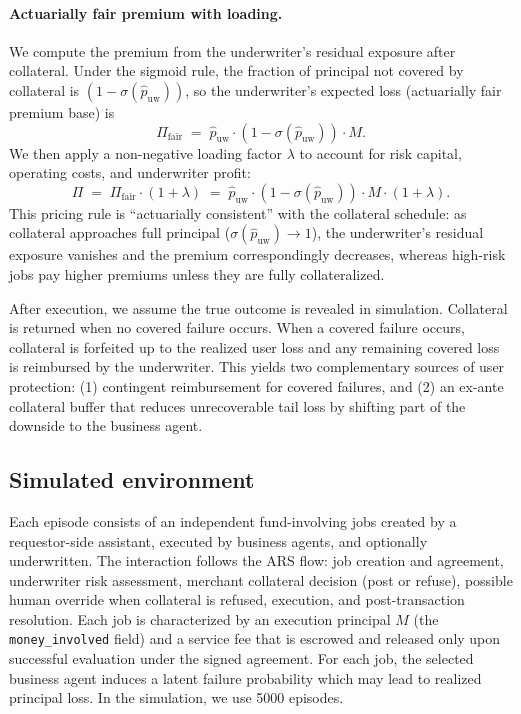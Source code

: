 \documentclass{article} %
\begin{document}
\paragraph{Actuarially fair premium with loading.}
We compute the premium from the underwriter's residual exposure after collateral. Under the sigmoid rule, the fraction of principal not covered by collateral is $(1-\sigma(\hat p_{\mathrm{uw}}))$, so the underwriter's expected loss (actuarially fair premium base) is
\[
\Pi_{\mathrm{fair}} \;=\; \hat p_{\mathrm{uw}}\cdot (1-\sigma(\hat p_{\mathrm{uw}}))\cdot M.
\]
We then apply a non-negative loading factor $\lambda$ to account for risk capital, operating costs, and underwriter profit:
\[
\Pi \;=\; \Pi_{\mathrm{fair}}\cdot (1+\lambda)
\;=\; \hat p_{\mathrm{uw}}\cdot (1-\sigma(\hat p_{\mathrm{uw}}))\cdot M\cdot (1+\lambda).
\]
This pricing rule is ``actuarially consistent'' with the collateral schedule: as collateral approaches full principal ($\sigma(\hat p_{\mathrm{uw}})\to 1$), the underwriter's residual exposure vanishes and the premium correspondingly decreases, whereas high-risk jobs pay higher premiums unless they are fully collateralized.

After execution, we assume the true outcome is revealed in simulation. Collateral is returned when no covered failure occurs. When a covered failure occurs, collateral is forfeited up to the realized user loss and any remaining covered loss is reimbursed by the underwriter. This yields two complementary sources of user protection: (1) contingent reimbursement for covered failures, and (2) an ex-ante collateral buffer that reduces unrecoverable tail loss by shifting part of the downside to the business agent.

\subsection{Simulated environment}
Each episode consists of an independent fund-involving jobs created by a requestor-side assistant, executed by business agents, and optionally underwritten. The interaction follows the \textsc{ARS} flow: job creation and agreement, underwriter risk assessment, merchant collateral decision (post or refuse), possible human override when collateral is refused, execution, and post-transaction resolution. Each job is characterized by an execution principal $M$ (the \texttt{money\_involved} field) and a service fee that is escrowed and released only upon successful evaluation under the signed agreement. For each job, the selected business agent induces a latent failure probability which may lead to realized principal loss. In the simulation, we use 5000 episodes.
\end{document}
